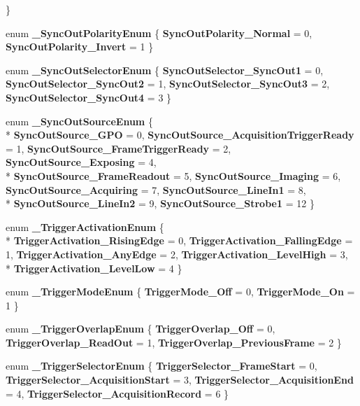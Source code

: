 \begin{DoxyCompactItemize}
 \}
\item 
enum {\bfseries \-\_\-\-Sync\-Out\-Polarity\-Enum} \{ {\bfseries Sync\-Out\-Polarity\-\_\-\-Normal} = 0, 
{\bfseries Sync\-Out\-Polarity\-\_\-\-Invert} = 1
 \}
\item 
enum {\bfseries \-\_\-\-Sync\-Out\-Selector\-Enum} \{ {\bfseries Sync\-Out\-Selector\-\_\-\-Sync\-Out1} = 0, 
{\bfseries Sync\-Out\-Selector\-\_\-\-Sync\-Out2} = 1, 
{\bfseries Sync\-Out\-Selector\-\_\-\-Sync\-Out3} = 2, 
{\bfseries Sync\-Out\-Selector\-\_\-\-Sync\-Out4} = 3
 \}
\item 
enum {\bfseries \-\_\-\-Sync\-Out\-Source\-Enum} \{ \\*
{\bfseries Sync\-Out\-Source\-\_\-\-G\-P\-O} = 0, 
{\bfseries Sync\-Out\-Source\-\_\-\-Acquisition\-Trigger\-Ready} = 1, 
{\bfseries Sync\-Out\-Source\-\_\-\-Frame\-Trigger\-Ready} = 2, 
{\bfseries Sync\-Out\-Source\-\_\-\-Exposing} = 4, 
\\*
{\bfseries Sync\-Out\-Source\-\_\-\-Frame\-Readout} = 5, 
{\bfseries Sync\-Out\-Source\-\_\-\-Imaging} = 6, 
{\bfseries Sync\-Out\-Source\-\_\-\-Acquiring} = 7, 
{\bfseries Sync\-Out\-Source\-\_\-\-Line\-In1} = 8, 
\\*
{\bfseries Sync\-Out\-Source\-\_\-\-Line\-In2} = 9, 
{\bfseries Sync\-Out\-Source\-\_\-\-Strobe1} = 12
 \}
\item 
enum {\bfseries \-\_\-\-Trigger\-Activation\-Enum} \{ \\*
{\bfseries Trigger\-Activation\-\_\-\-Rising\-Edge} = 0, 
{\bfseries Trigger\-Activation\-\_\-\-Falling\-Edge} = 1, 
{\bfseries Trigger\-Activation\-\_\-\-Any\-Edge} = 2, 
{\bfseries Trigger\-Activation\-\_\-\-Level\-High} = 3, 
\\*
{\bfseries Trigger\-Activation\-\_\-\-Level\-Low} = 4
 \}
\item 
enum {\bfseries \-\_\-\-Trigger\-Mode\-Enum} \{ {\bfseries Trigger\-Mode\-\_\-\-Off} = 0, 
{\bfseries Trigger\-Mode\-\_\-\-On} = 1
 \}
\item 
enum {\bfseries \-\_\-\-Trigger\-Overlap\-Enum} \{ {\bfseries Trigger\-Overlap\-\_\-\-Off} = 0, 
{\bfseries Trigger\-Overlap\-\_\-\-Read\-Out} = 1, 
{\bfseries Trigger\-Overlap\-\_\-\-Previous\-Frame} = 2
 \}
\item 
enum {\bfseries \-\_\-\-Trigger\-Selector\-Enum} \{ {\bfseries Trigger\-Selector\-\_\-\-Frame\-Start} = 0, 
{\bfseries Trigger\-Selector\-\_\-\-Acquisition\-Start} = 3, 
{\bfseries Trigger\-Selector\-\_\-\-Acquisition\-End} = 4, 
{\bfseries Trigger\-Selector\-\_\-\-Acquisition\-Record} = 6
 \}
\item 

\end{DoxyCompactItemize}
